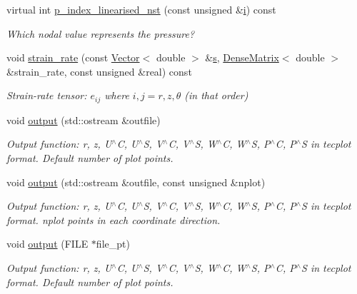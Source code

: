 \begin{DoxyCompactItemize}
virtual int \hyperlink{classoomph_1_1LinearisedNavierStokesEquations_ae27e5313386ad80524a5aae41a1e23e1}{p\+\_\+index\+\_\+linearised\+\_\+nst} (const unsigned \&\hyperlink{cfortran_8h_adb50e893b86b3e55e751a42eab3cba82}{i}) const
\begin{DoxyCompactList}\small\item\em Which nodal value represents the pressure? \end{DoxyCompactList}\item 
void \hyperlink{classoomph_1_1LinearisedNavierStokesEquations_a4e88fcd2c85042a0dd98bba1bd37fcb0}{strain\+\_\+rate} (const \hyperlink{classoomph_1_1Vector}{Vector}$<$ double $>$ \&\hyperlink{cfortran_8h_ab7123126e4885ef647dd9c6e3807a21c}{s}, \hyperlink{classoomph_1_1DenseMatrix}{Dense\+Matrix}$<$ double $>$ \&strain\+\_\+rate, const unsigned \&real) const
\begin{DoxyCompactList}\small\item\em Strain-\/rate tensor\+: $ e_{ij} $ where $ i,j = r,z,\theta $ (in that order) \end{DoxyCompactList}\item 
void \hyperlink{classoomph_1_1LinearisedNavierStokesEquations_a87e366a3fe677cbbb99f4cba17d0f4c6}{output} (std\+::ostream \&outfile)
\begin{DoxyCompactList}\small\item\em Output function\+: r, z, U$^\wedge$C, U$^\wedge$S, V$^\wedge$C, V$^\wedge$S, W$^\wedge$C, W$^\wedge$S, P$^\wedge$C, P$^\wedge$S in tecplot format. Default number of plot points. \end{DoxyCompactList}\item 
void \hyperlink{classoomph_1_1LinearisedNavierStokesEquations_a66bb65cc2c52846e76f8d02c1f956215}{output} (std\+::ostream \&outfile, const unsigned \&nplot)
\begin{DoxyCompactList}\small\item\em Output function\+: r, z, U$^\wedge$C, U$^\wedge$S, V$^\wedge$C, V$^\wedge$S, W$^\wedge$C, W$^\wedge$S, P$^\wedge$C, P$^\wedge$S in tecplot format. nplot points in each coordinate direction. \end{DoxyCompactList}\item 
void \hyperlink{classoomph_1_1LinearisedNavierStokesEquations_a2e1eef71bdd6a06e2b7e8b8488e39437}{output} (F\+I\+LE $\ast$file\+\_\+pt)
\begin{DoxyCompactList}\small\item\em Output function\+: r, z, U$^\wedge$C, U$^\wedge$S, V$^\wedge$C, V$^\wedge$S, W$^\wedge$C, W$^\wedge$S, P$^\wedge$C, P$^\wedge$S in tecplot format. Default number of plot points. \end{DoxyCompactList}\item 

\end{DoxyCompactItemize}
